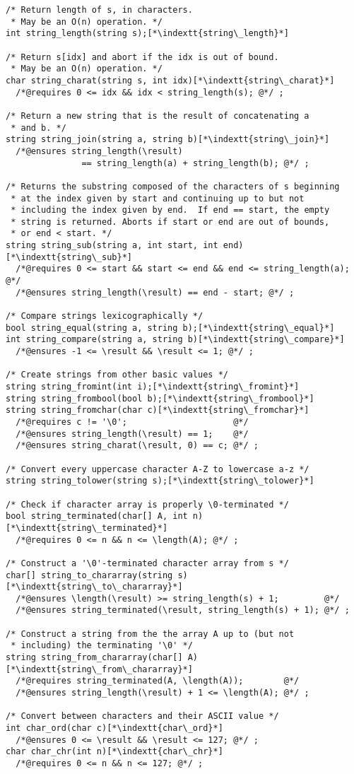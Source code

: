 \documentclass[11pt]{article}
\makeatletter
\newcommand{\indextt}[1]{\index{#1@\texttt{#1}}}
\makeatother
\begin{document}
\begin{lstlisting}
/* Return length of s, in characters.
 * May be an O(n) operation. */
int string_length(string s);[*\indextt{string\_length}*]

/* Return s[idx] and abort if the idx is out of bound.
 * May be an O(n) operation. */
char string_charat(string s, int idx)[*\indextt{string\_charat}*]
  /*@requires 0 <= idx && idx < string_length(s); @*/ ;

/* Return a new string that is the result of concatenating a
 * and b. */
string string_join(string a, string b)[*\indextt{string\_join}*]
  /*@ensures string_length(\result)
               == string_length(a) + string_length(b); @*/ ;

/* Returns the substring composed of the characters of s beginning
 * at the index given by start and continuing up to but not
 * including the index given by end.  If end == start, the empty
 * string is returned. Aborts if start or end are out of bounds,
 * or end < start. */
string string_sub(string a, int start, int end)[*\indextt{string\_sub}*]
  /*@requires 0 <= start && start <= end && end <= string_length(a); @*/
  /*@ensures string_length(\result) == end - start; @*/ ;

/* Compare strings lexicographically */
bool string_equal(string a, string b);[*\indextt{string\_equal}*]
int string_compare(string a, string b)[*\indextt{string\_compare}*]
  /*@ensures -1 <= \result && \result <= 1; @*/ ;

/* Create strings from other basic values */
string string_fromint(int i);[*\indextt{string\_fromint}*]
string string_frombool(bool b);[*\indextt{string\_frombool}*]
string string_fromchar(char c)[*\indextt{string\_fromchar}*]
  /*@requires c != '\0';                     @*/
  /*@ensures string_length(\result) == 1;    @*/
  /*@ensures string_charat(\result, 0) == c; @*/ ;

/* Convert every uppercase character A-Z to lowercase a-z */
string string_tolower(string s);[*\indextt{string\_tolower}*]

/* Check if character array is properly \0-terminated */
bool string_terminated(char[] A, int n)[*\indextt{string\_terminated}*]
  /*@requires 0 <= n && n <= \length(A); @*/ ;

/* Construct a '\0'-terminated character array from s */
char[] string_to_chararray(string s)[*\indextt{string\_to\_chararray}*]
  /*@ensures \length(\result) >= string_length(s) + 1;         @*/
  /*@ensures string_terminated(\result, string_length(s) + 1); @*/ ;

/* Construct a string from the the array A up to (but not
 * including) the terminating '\0' */
string string_from_chararray(char[] A)[*\indextt{string\_from\_chararray}*]
  /*@requires string_terminated(A, \length(A));        @*/
  /*@ensures string_length(\result) + 1 <= \length(A); @*/ ;

/* Convert between characters and their ASCII value */
int char_ord(char c)[*\indextt{char\_ord}*]
  /*@ensures 0 <= \result && \result <= 127; @*/ ;
char char_chr(int n)[*\indextt{char\_chr}*]
  /*@requires 0 <= n && n <= 127; @*/ ;
\end{lstlisting}
\end{document}
